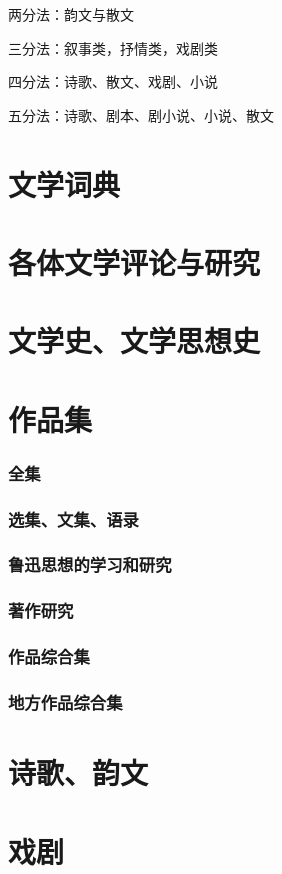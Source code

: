 \documentclass[UTF8]{../../RepresentationUniverse}
\begin{document}
两分法：韵文与散文

三分法：叙事类，抒情类，戏剧类

四分法：诗歌、散文、戏剧、小说

五分法：诗歌、剧本、剧小说、小说、散文

\section{文学词典}
\section{各体文学评论与研究}
\section{文学史、文学思想史}

\section{作品集}

\subsubsection{全集}
\subsubsection{选集、文集、语录}
\subsubsection{鲁迅思想的学习和研究}
\subsubsection{著作研究}

\subsubsection{作品综合集}
\subsubsection{地方作品综合集}

\section{诗歌、韵文}


\section{戏剧}
\end{document}
